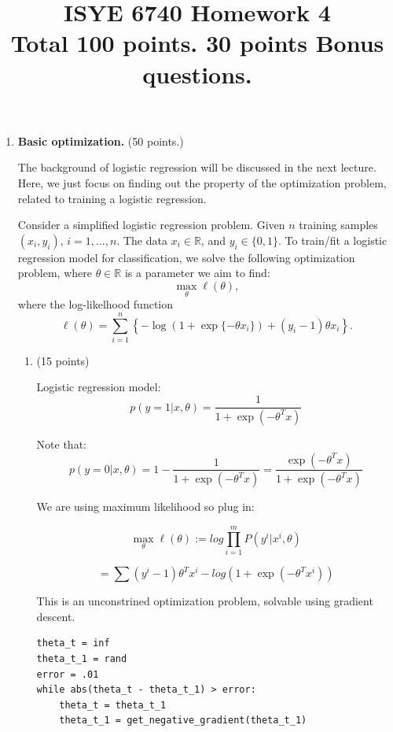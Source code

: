 \documentclass[twoside,10pt]{article}
\begin{document}
\title{ISYE 6740 Homework 4\\ 
\small Total 100 points. 30 points Bonus questions.}
\date{}
\maketitle


\begin{enumerate}

\item {\bf Basic optimization.} (50 points.)

The background of logistic regression will be discussed in the next lecture. Here, we just focus on finding out the property of the optimization problem, related to training a logistic regression. 

Consider a simplified logistic regression problem. 
Given $n$ training samples $(x_i, y_i)$, $i = 1, \ldots, n$. The data $x_i \in \mathbb R$, and $y_i \in \{0, 1\}$.  To train/fit a logistic regression model for classification, we solve the following optimization problem, where $\theta \in \mathbb R$ is a parameter we aim to find:
\begin{equation}
\max_\theta \ell (\theta), \label{eqn}
\end{equation}
where the log-likelhood function \[\ell(\theta) = \sum_{i=1}^n \left\{-\log (1+\exp\{-\theta x_i\}) + (y_i-1) \theta x_i\right\}.\]

\begin{enumerate}
\item (15 points) 

Logistic regression model:
$$p(y =1|x,\theta) = \frac{1}{1+\exp(-\theta^Tx)}$$

Note that:
$$p(y =0 |x,\theta) = 1 - \frac{1}{1+\exp(-\theta^Tx)}=\frac{\exp(-\theta^Tx)}{1+\exp(-\theta^Tx)}$$

We are using maximum likelihood so plug in:

$$\max_\theta \ell (\theta):=log \prod_{i=1}^{m}P(y^i|x^i,\theta)$$

$$=\sum(y^i-1)\theta^Tx^i-log(1+\exp(-\theta^Tx^i))$$ 

This is an unconstrined optimization problem, solvable using gradient descent.

\begin{lstlisting}
theta_t = inf
theta_t_1 = rand
error = .01
while abs(theta_t - theta_t_1) > error:
	theta_t = theta_t_1
	theta_t_1 = get_negative_gradient(theta_t_1)
\end{lstlisting}





\end{enumerate}
\end{enumerate}
\end{document}
